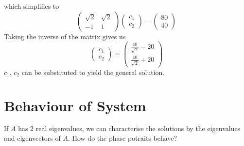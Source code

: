 \documentclass[12pt]{article}
\begin{document}
which simplifies to
$$\begin{pmatrix} \sqrt{2} & \sqrt{2} \\ -1 & 1 \end{pmatrix} \begin{pmatrix} c_1 \\ c_2 \end{pmatrix} = \begin{pmatrix} 80 \\ 40 \end{pmatrix}$$
Taking the inverse of the matrix gives us
$$\begin{pmatrix} c_1 \\ c_2 \end{pmatrix} = \begin{pmatrix} \frac{40}{\sqrt{2}} - 20 \\ \frac{40}{\sqrt{2}} + 20 \end{pmatrix}$$
$c_1$, $c_2$ can be substituted to yield the general solution.

\section{Behaviour of System}
If $A$ has 2 real eigenvalues, we can characterise the solutions by the eigenvalues and eigenvectors of $A$. How do the phase potraits behave?
\end{document}
